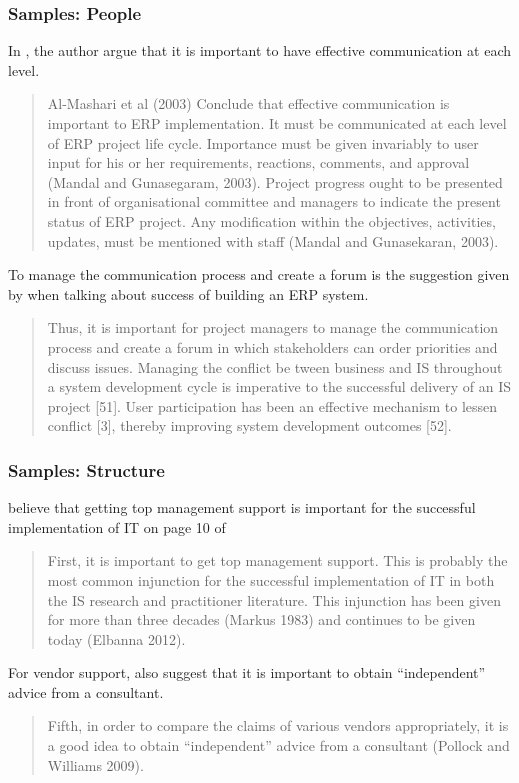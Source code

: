 \subsubsection{Samples: People}
In , the author argue that it is important to have effective communication at each level.
\begin{quotation}
Al-Mashari et al (2003) Conclude that effective communication is important to ERP implementation. It must be communicated at each level of ERP project life cycle. Importance must be given invariably to user input for his or her requirements, reactions, comments, and approval (Mandal and Gunasegaram, 2003). Project progress ought to be presented in front of organisational committee and managers to indicate the present status of ERP project. Any modification within the objectives, activities, updates, must be mentioned with staff (Mandal and Gunasekaran, 2003).
\end{quotation}


To manage the communication process and create a forum is the suggestion given by \citeauthor{2} when talking about success of building an ERP system.
\begin{quotation}
Thus, it is important for project managers to manage the communication process and create a forum in which stakeholders can order priorities and discuss issues. Managing the conflict be tween business and IS throughout a system development cycle is imperative to the successful delivery of an IS project [51]. User participation has been an effective mechanism to lessen conflict [3], thereby improving system development outcomes [52].
\end{quotation}


\subsubsection{Samples: Structure}
\citeauthor{6} believe that getting top management support is important for the successful implementation of IT on page 10 of 
\begin{quotation}
First, it is important to get top management support. This is probably the most common injunction for the successful implementation of IT in both the IS research and practitioner literature. This injunction has been given for more than three decades (Markus 1983) and continues to be given today (Elbanna 2012).
\end{quotation}

For vendor support, \citeauthor{6} also suggest that it is important to obtain “independent” advice from a consultant.
\begin{quotation}
Fifth, in order to compare the claims of various vendors appropriately, it is a good idea to obtain “independent” advice from a consultant (Pollock and Williams 2009).
\end{quotation}

